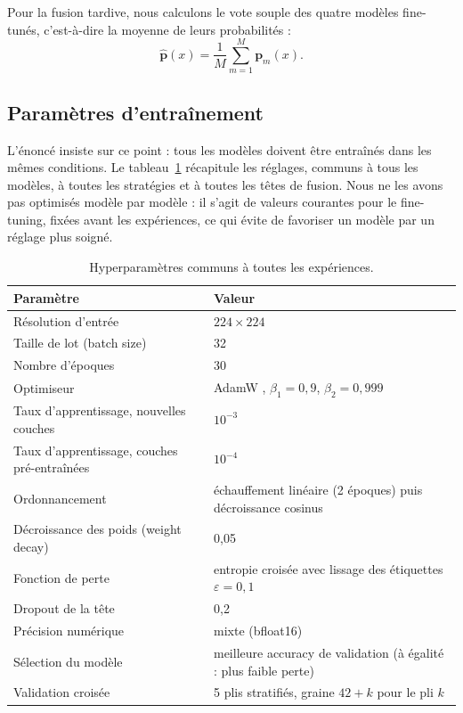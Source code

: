 Pour la fusion tardive, nous calculons le vote souple des quatre modèles fine-tunés, c'est-à-dire la moyenne de leurs probabilités :
\begin{equation}
\hat{\mathbf{p}}(x) = \frac{1}{M}\sum_{m=1}^{M} \mathbf{p}_m(x).
\label{eq:late}
\end{equation}

\subsection{Paramètres d'entraînement}
\label{sec:parametres}

L'énoncé insiste sur ce point : tous les modèles doivent être entraînés dans les mêmes conditions. Le tableau~\ref{tab:hyper} récapitule les réglages, communs à tous les modèles, à toutes les stratégies et à toutes les têtes de fusion. Nous ne les avons pas optimisés modèle par modèle : il s'agit de valeurs courantes pour le fine-tuning, fixées avant les expériences, ce qui évite de favoriser un modèle par un réglage plus soigné.

\begin{table}[htbp]
\centering
\caption{Hyperparamètres communs à toutes les expériences.}
\label{tab:hyper}
\small
\begin{tabularx}{0.92\textwidth}{l X}
\toprule
\textbf{Paramètre} & \textbf{Valeur} \\
\midrule
Résolution d'entrée & $224\times224$ \\
Taille de lot (batch size) & 32 \\
Nombre d'époques & 30 \\
Optimiseur & AdamW \cite{loshchilov2019decoupled}, $\beta_1=0{,}9$, $\beta_2=0{,}999$ \\
Taux d'apprentissage, nouvelles couches & $10^{-3}$ \\
Taux d'apprentissage, couches pré-entraînées & $10^{-4}$ \\
Ordonnancement & échauffement linéaire (2 époques) puis décroissance cosinus \\
Décroissance des poids (weight decay) & 0,05 \\
Fonction de perte & entropie croisée avec lissage des étiquettes $\varepsilon=0{,}1$ \\
Dropout de la tête & 0,2 \\
Précision numérique & mixte (bfloat16) \\
Sélection du modèle & meilleure accuracy de validation (à égalité : plus faible perte) \\
Validation croisée & 5 plis stratifiés, graine $42+k$ pour le pli $k$ \\
\bottomrule
\end{tabularx}
\end{table}

